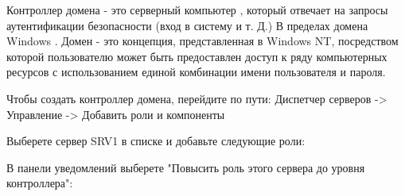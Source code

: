 \documentclass[a4paper, 12pt]{report}
\begin{document}
	Контроллер домена - это серверный компьютер , который отвечает на запросы аутентификации безопасности (вход в систему и т. Д.) В пределах домена Windows . Домен - это концепция, представленная в Windows NT, посредством которой пользователю может быть предоставлен доступ к ряду компьютерных ресурсов с использованием единой комбинации имени пользователя и пароля.
	
	Чтобы создать контроллер домена, перейдите по пути: Диспетчер серверов -> Управление -> Добавить роли и компоненты
	
	Выберете сервер SRV1 в списке и добавьте следующие роли:
	
	\begin{figure}[h]
		\label{fig:image}
	\end{figure}

	\clearpage

	В панели уведомлений выберете "Повысить роль этого сервера до уровня контроллера":
	
	\begin{figure}[h]
		\label{fig:image}
	\end{figure}
\end{document}
